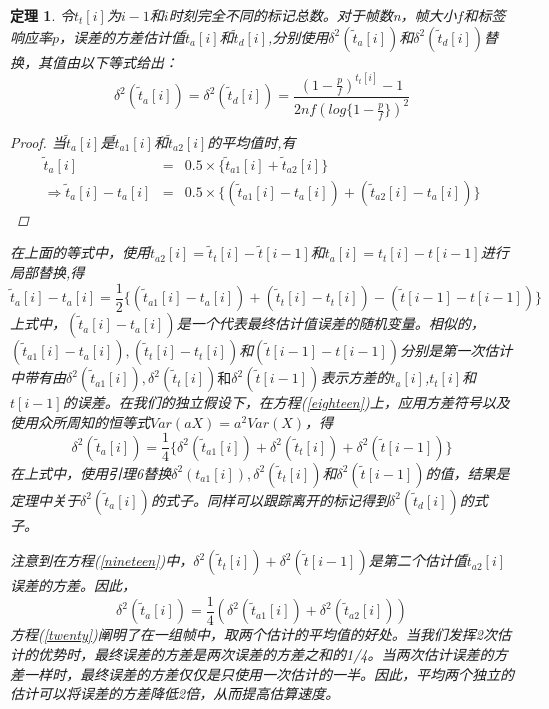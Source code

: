\documentclass[UTF8]{ctexart}
\newtheorem{theorem}{定理}
\newtheorem*{proof}{证明}
\begin{document}
\begin{theorem}
	令$t_t[i]$为$i-1$和$i$时刻完全不同的标记总数。对于帧数n，帧大小$f$和标签响应率$p$，误差的方差估计值$\widetilde{t}_a[i]$和$\widetilde{t}_d[i]$,分别使用$\delta^2(\widetilde{t}_a[i])$和$\delta^2(\widetilde{t}_d[i])$替换，其值由以下等式给出：
	\begin{equation}\label{seventeen}
	\delta^2(\widetilde{t}_a[i])=\delta^2(\widetilde{t}_d[i])=\frac{(1-\frac{p}{f})^{t_t[i]}-1}{2nf(log\{1-\frac{p}{f}\})^2}
	\end{equation}
	\begin{proof}
		当$\widetilde{t}_a[i]$是$\widetilde{t}_{a1}[i]$和$\widetilde{t}_{a2}[i]$的平均值时,有
		\begin{eqnarray*}
			\widetilde{t}_a[i]&=&0.5\times \{\widetilde{t}_{a1}[i]+\widetilde{t}_{a2}[i]\}\\
			\Rightarrow\widetilde{t}_a[i]-t_a[i]&=&0.5\times \{(\widetilde{t}_{a1}[i]-t_a[i])+(\widetilde{t}_{a2}[i]-t_a[i])\}
		\end{eqnarray*}
	\end{proof}
	在上面的等式中，使用$\widetilde{t}_{a2}[i]=\widetilde{t}_t[i]-\widetilde{t}[i-1]$和$t_a[i]=t_t[i]-t[i-1]$进行局部替换,得
	\begin{equation}\label{eighteen}
	\widetilde{t}_a[i]-t_a[i]=\frac{1}{2}\{(\widetilde{t}_{a1}[i]-t_a[i])+(\widetilde{t}_t[i]-t_t[i])-(\widetilde{t}[i-1]-t[i-1])\}
	\end{equation}
	上式中，$(\widetilde{t}_a[i]-t_a[i])$是一个代表最终估计值误差的随机变量。相似的，$(\widetilde{t}_{a1}[i]-t_a[i]),(\widetilde{t}_t[i]-t_t[i])$和$(\widetilde{t}[i-1]-t[i-1])$分别是第一次估计中带有由$\delta^2(\widetilde{t}_{a1}[i]),\delta^2(\widetilde{t}_t[i])和\delta^2(\widetilde{t}[i-1])$表示方差的$t_a[i]$,$t_t[i]$和$t[i-1]$的误差。在我们的独立假设下，在方程(\ref{eighteen})上，应用方差符号以及使用众所周知的恒等式$Var(aX)=a^2Var(X)$，得
	\begin{equation}\label{nineteen}
	\delta^2(\widetilde{t}_a[i])=\frac{1}{4}\{\delta^2(\widetilde{t}_{a1}[i])+\delta^2(\widetilde{t}_t[i])+\delta^2(\widetilde{t}[i-1])\}
	\end{equation}
	在上式中，使用引理6替换$\delta^2(t_{a1}[i]),\delta^2(\widetilde{t}_t[i])$和$\delta^2(\widetilde{t}[i-1])$的值，结果是定理中关于$\delta^2(\widetilde{t}_a[i])$的式子。同样可以跟踪离开的标记得到$\delta^2(\widetilde{t}_d[i])$的式子。
	
	注意到在方程(\ref{nineteen})中，$\delta^2(\widetilde{t}_t[i])+\delta^2(\widetilde{t}[i-1])$是第二个估计值$\widetilde{t}_{a2}[i]$误差的方差。因此，
	\begin{equation}\label{twenty}
	\delta^2(\widetilde{t}_a[i])=\frac{1}{4}(\delta^2(\widetilde{t}_{a1}[i])+\delta^2(\widetilde{t}_{a2}[i]))
	\end{equation}
	方程(\ref{twenty})阐明了在一组帧中，取两个估计的平均值的好处。当我们发挥2次估计的优势时，最终误差的方差是两次误差的方差之和的1/4。当两次估计误差的方差一样时，最终误差的方差仅仅是只使用一次估计的一半。因此，平均两个独立的估计可以将误差的方差降低2倍，从而提高估算速度。
\end{theorem}
\end{document}
